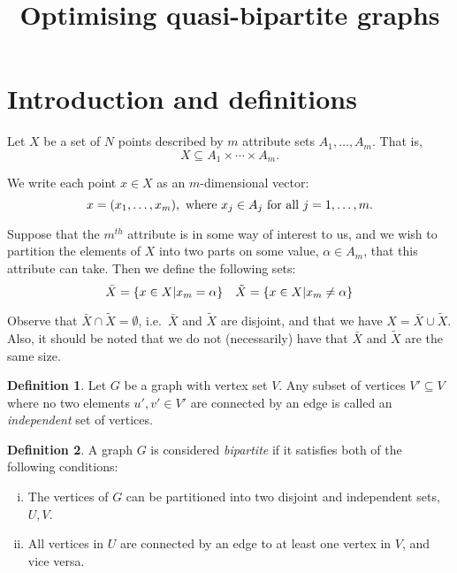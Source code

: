 \documentclass{article}
\title{Optimising quasi-bipartite graphs}
\theoremstyle{definition} \newtheorem{definition}{Definition}
\begin{document}
\maketitle

\section{Introduction and definitions}\label{sec:intro}

Let \(X\) be a set of \(N\) points described by \(m\) attribute sets \(A_1,
\ldots, A_m\). That is,
\[
    X \subseteq A_1 \times \cdots \times A_m.
\]

We write each point \(x \in X\) as an \(m\)-dimensional vector:
\[
    x = (x_1, \ldots, x_m), \ \text{where} \ x_j \in A_j \ \text{for all} \ j =
    1, \ldots, m.\\
\]

Suppose that the \(m^{th}\) attribute is in some way of interest to us, and we
wish to partition the elements of \(X\) into two parts on some value,
\(\alpha \in A_m\), that this attribute can take. Then we define the following
sets:
\[
    \bar{X} = \{ x \in X | x_m = \alpha \} \quad \tilde{X} = \{ x \in X | x_m
    \neq \alpha \}\\
\]

Observe that \(\bar{X} \cap \tilde{X} = \emptyset\), i.e.\ \(\bar{X}\) and
\(\tilde{X}\) are disjoint, and that we have \(X = \bar{X} \cup \tilde{X}\).
Also, it should be noted that we do not (necessarily) have that \(\bar{X}\) and
\(\tilde{X}\) are the same size.\\

\begin{definition}
    Let \(G\) be a graph with vertex set \(V\). Any subset of vertices \(V'
    \subseteq V\) where no two elements \(u', v' \in V'\) are connected by an
    edge is called an \emph{independent} set of vertices.\\
\end{definition}

\begin{definition}
    A graph \(G\) is considered \emph{bipartite} if it satisfies both of the
    following conditions:
    \begin{enumerate}[(i)]
        \item The vertices of \(G\) can be partitioned into two disjoint and
            independent sets, \(U, V\).
        \item All vertices in \(U\) are connected by an edge to at least one
            vertex in \(V\), and vice versa.\\
    \end{enumerate}
\end{definition}
\end{document}
